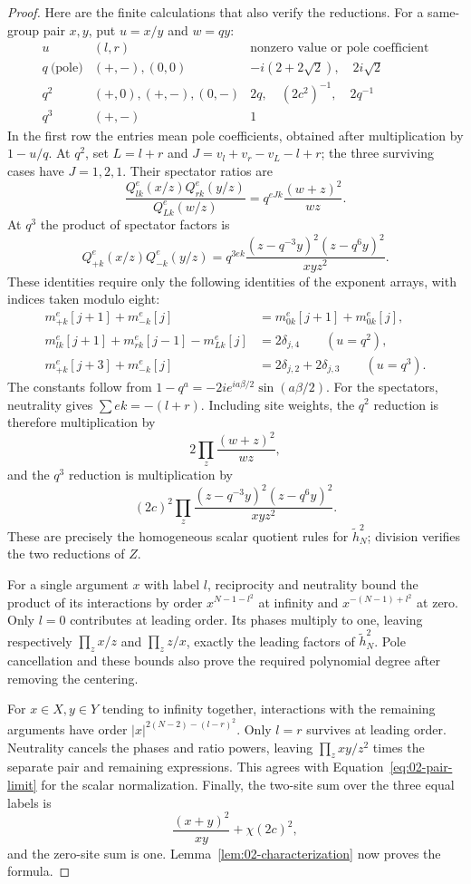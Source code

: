 \begin{proof}
Here are the finite calculations that also verify the reductions.
For a same-group pair $x,y$, put $u=x/y$ and $w=qy$:
\[
\begin{array}{c|c|c}
 u&(l,r)&\text{nonzero value or pole coefficient}\\\hline
 q\ \text{(pole)} &(+,-),(0,0)&-i(2+2\sqrt2),\quad 2i\sqrt2\\
 q^2 &(+,0),(+,-),(0,-)&2q,\quad(2c^2)^{-1},\quad2q^{-1}\\
 q^3 &(+,-)&1
\end{array}
\]
In the first row the entries mean pole coefficients, obtained after
multiplication by $1-u/q$. At $q^2$, set
$L=l+r$ and $J=v_l+v_r-v_L-l+r$; the three surviving cases have
$J=1,2,1$. Their spectator ratios are
\[
 \frac{Q^e_{lk}(x/z)Q^e_{rk}(y/z)}{Q^e_{Lk}(w/z)}
       =q^{eJk}\frac{(w+z)^2}{wz}.
\]
At $q^3$ the product of spectator factors is
\[
 Q^e_{+k}(x/z)Q^e_{-k}(y/z)
 =q^{3ek}\frac{(z-q^{-3}y)^2(z-q^6y)^2}{xyz^2}.
\]
These identities require only the following identities of the
exponent arrays, with indices taken modulo eight:
\[
\begin{split}
 m^e_{+k}[j+1]+m^e_{-k}[j]
     &=m^e_{0k}[j+1]+m^e_{0k}[j],\\
 m^e_{lk}[j+1]+m^e_{rk}[j-1]-m^e_{Lk}[j]
     &=2\delta_{j,4}\qquad(u=q^2),\\
 m^e_{+k}[j+3]+m^e_{-k}[j]
     &=2\delta_{j,2}+2\delta_{j,3}\qquad(u=q^3).
\end{split}
\]
The constants follow from
$1-q^a=-2ie^{ia\beta/2}\sin(a\beta/2)$.
For the spectators, neutrality gives $\sum ek=-(l+r)$.
Including site weights, the $q^2$ reduction is therefore multiplication
by
\[
 2\prod_z\frac{(w+z)^2}{wz},
\]
and the $q^3$ reduction is multiplication by
\[
 (2c)^2\prod_z\frac{(z-q^{-3}y)^2(z-q^6y)^2}{xyz^2}.
\]
These are precisely the homogeneous scalar quotient rules for
$\widetilde h_N^2$; division verifies the two reductions of $Z$.

For a single argument $x$ with label $l$, reciprocity and neutrality
bound the product of its interactions by order $x^{N-1-l^2}$ at
infinity and $x^{-(N-1)+l^2}$ at zero. Only $l=0$ contributes at
leading order. Its phases multiply to one, leaving respectively
$\prod_zx/z$ and $\prod_zz/x$, exactly the leading factors of
$\widetilde h_N^2$. Pole cancellation and these bounds also prove
the required polynomial degree after removing the centering.

For $x\in X,y\in Y$ tending to infinity together, interactions with
the remaining arguments have order
$|x|^{2(N-2)-(l-r)^2}$. Only $l=r$ survives at leading order.
Neutrality cancels the phases and ratio powers, leaving
$\prod_zxy/z^2$ times the separate pair and remaining expressions.
This agrees with Equation~\eqref{eq:02-pair-limit} for the scalar
normalization. Finally, the two-site sum over the three equal labels
is
\[
 \frac{(x+y)^2}{xy}+\chi(2c)^2,
\]
and the zero-site sum is one. Lemma~\ref{lem:02-characterization}
now proves the formula.
\end{proof}

